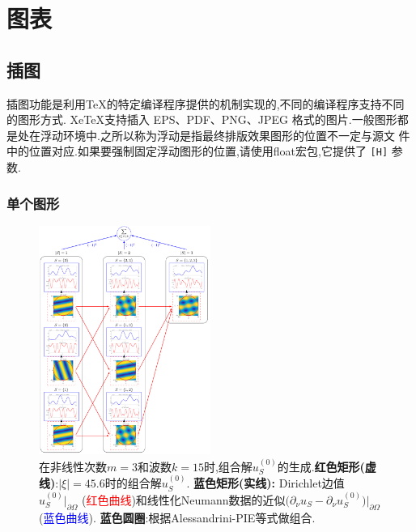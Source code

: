 \documentclass[a4paper,punct=banjiao,twoside]{ctexrep}
\theoremstyle{plain}
\theoremstyle{definition}
\theoremstyle{remark}
\begin{document}
\chapter{图表}
\section{插图}
插图功能是利用TeX的特定编译程序提供的机制实现的,不同的编译程序支持不同的图形方式. XeTeX支持插入 EPS、PDF、PNG、JPEG 格式的图片.一般图形都是处在浮动环境中.之所以称为浮动是指最终排版效果图形的位置不一定与源文
件中的位置对应.如果要强制固定浮动图形的位置,请使用float宏包,它提供了 \texttt{[H]} 参数.

\subsection{单个图形}
\begin{figure}[H]
    \begin{center}
        \includegraphics[width=0.5\textwidth]{./figs/cost.png}
\caption[Alessandrini-PIE等式与组合解$u_{S}^{(0)}$]{在非线性次数$m=3$和波数$k=15$时,组合解$u_{S}^{(0)}$的生成.\textbf{红色矩形(虚线)}:$|\xi| = 45.6$时的组合解$u_{S}^{(0)}$.
\textbf{蓝色矩形(实线):} Dirichlet边值 $u_{S}^{(0)} \big|_{\partial\Omega}$ (\textcolor{red}{红色曲线})和线性化Neumann数据的近似$\big( \partial_{\nu} u_{S} - \partial_{\nu} u_{S}^{(0)} \big) \big|_{\partial\Omega}$ (\textcolor{blue}{蓝色曲线}).
\textbf{蓝色圆圈}:根据Alessandrini-PIE等式做组合.}
\label{fig:superposition}
\end{center}
\end{figure}
\end{document}
